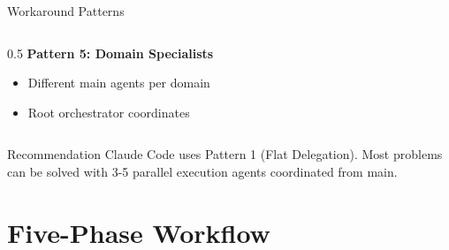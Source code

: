 \documentclass[aspectratio=169,11pt]{beamer}
\begin{document}
\begin{frame}{Workaround Patterns}
\begin{columns}[T]
\begin{column}{0.5\textwidth}
            \vspace{0.3cm}
            \textbf{Pattern 5: Domain Specialists}
            \begin{itemize}
                \item Different main agents per domain
                \item Root orchestrator coordinates
            \end{itemize}
        \end{column}
    \end{columns}

    \vspace{0.3cm}
    \begin{block}{Recommendation}
        Claude Code uses Pattern 1 (Flat Delegation). Most problems can be solved with 3-5 parallel execution agents coordinated from main.
    \end{block}
\end{frame}

\section{Five-Phase Workflow}
\end{document}
